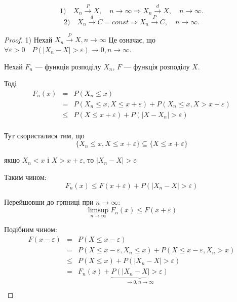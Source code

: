 \begin{theorem}
    $$1) \quad X_n \xrightarrow{P} X, \quad n \rightarrow \infty
        \Rightarrow X_n \xrightarrow{d} X, \quad n \rightarrow \infty.$$
    $$2) \quad X_n \xrightarrow{d} C = const
        \Rightarrow X_n \xrightarrow{P} C, \quad n \rightarrow \infty.$$
\end{theorem}
\begin{proof}
    1) Нехай $X_n \xrightarrow{P} X, n \rightarrow \infty$ Це означає,
    що $\forall \varepsilon > 0 \quad P(|X_n - X| > \varepsilon) \rightarrow 0, n \rightarrow \infty$.
    
    Нехай $F_n$ --- функція розподілу $X_n$, $F$ --- функція розподілу $X$.
    
    Тоді
    $$ \begin{array}{rcl}
        F_n(x) & = & P(X_n \leqslant x) \\
        & = & P(X_n \leqslant x, X \leqslant x + \varepsilon)
            + P(X_n \leqslant x, X > x + \varepsilon) \\
        & \leqslant & P(X \leqslant x + \varepsilon)
            + P(|X - X_n| > \varepsilon) \\
    \end{array}$$

    Тут скористалися тим, що
    $$\{X_n \leqslant x, X \leqslant x + \varepsilon\}
    \subseteq \{X \leqslant x + \varepsilon\}$$

    якщо $X_n < x$ і $X > x + \varepsilon$, то
    $|X_n - X| > \varepsilon$ 

    Таким чином:
    $$F_n(x)
    \leqslant F(x+\varepsilon) + P(|X_n - X| > \varepsilon)$$

    Перейшовши до грпниці при $n \rightarrow \infty$:
    $$\limsup\limits_{n \rightarrow \infty} F_n(x) \leqslant F(x + \varepsilon)$$

    Подібним чином:
    $$\begin{array}{rcl}
        F(x - \varepsilon) & = & P(X \leqslant x - \varepsilon) \\
        & = & P(X \leqslant x - \varepsilon, X_n \leqslant x)
            + P(X \leqslant x - \varepsilon, X_n > x) \\
        & \leqslant & P(X \leqslant x)
            + P(|X_n - X| > \varepsilon) \\
        & = & F_n(x) + \underbrace{P(|X_n - X| > \varepsilon)}_{\rightarrow 0, n \rightarrow \infty} \\
    \end{array}$$


\end{proof}
